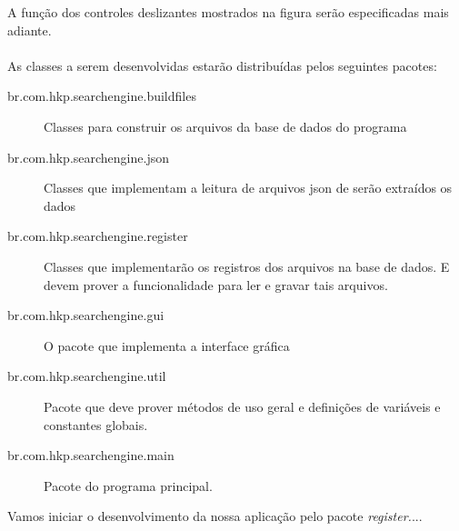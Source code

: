 \documentclass[a4paper,12pt,openany]{book}
\begin{document}
A função dos controles deslizantes mostrados na figura serão especificadas mais adiante.
\\\\
As classes a serem desenvolvidas estarão distribuídas pelos seguintes pacotes:
\begin{description}
	\item[br.com.hkp.searchengine.buildfiles] Classes para construir os arquivos da base de dados do programa
	\item[br.com.hkp.searchengine.json] Classes que implementam a leitura de arquivos json de serão extraídos os dados
	\item[br.com.hkp.searchengine.register] Classes que implementarão os registros dos arquivos na base de dados. E devem prover a funcionalidade para ler e gravar tais arquivos. 
	\item[br.com.hkp.searchengine.gui] O pacote que implementa a interface gráfica
	\item[br.com.hkp.searchengine.util] Pacote que deve prover métodos de uso geral e definições de variáveis e constantes globais.
	\item[br.com.hkp.searchengine.main] Pacote do programa principal. 
\end{description}

Vamos iniciar o desenvolvimento da nossa aplicação pelo pacote \textit{register.}...




\newpage

 
\end{document}
